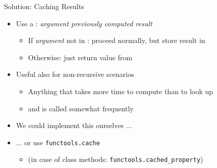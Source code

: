 \begin{frame}[fragile]{Solution: Caching Results}
%
\begin{itemize}
\item Use a : \emph{argument} \thus \emph{previously computed result}
	\begin{itemize}
	\item If \emph{argument} not in : proceed normally, but store result in 
	\item Otherwise: just return value from 
	\end{itemize}
\item Useful also for non-recursive scenarios
	\begin{itemize}
	\item Anything that takes more time to compute than to look up
	\item and is called somewhat frequently
	\end{itemize}
\item We could implement this ourselves ...
\item ... or use \texttt{functools.cache}
	\begin{itemize}
	\item (in case of class methods: \texttt{functools.cached\_property})
	\end{itemize}
\end{itemize}
%
\end{frame}


